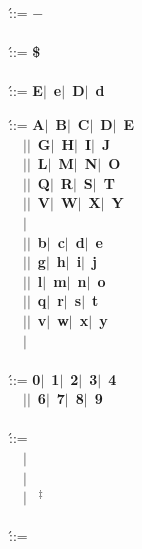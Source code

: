 \begin{bnf_tabbing}
\>  \' ::= \> {\bf\boldmath $-$} \\
\\
\>  \' ::= \> {\bf \$} \\
\\
\digittabbing
\>  \' ::= \> 
   {\bf E}\>$|$~{\bf e}\>$|$~{\bf D}\>$|$~{\bf d} \\
\end{bnf_tabbing}\newpage\begin{bnf_tabbing}
\digittabbing
\>  \' ::= \> 
   {\bf A}\>$|$~{\bf B}\>$|$~{\bf C}\>$|$~{\bf D}\>$|$~{\bf E} \\
\>~~$|$\>$|$~{\bf G}\>$|$~{\bf H}\>$|$~{\bf I}\>$|$~{\bf J} \\
\>~~$|$\>$|$~{\bf L}\>$|$~{\bf M}\>$|$~{\bf N}\>$|$~{\bf O} \\
\>~~$|$\>$|$~{\bf Q}\>$|$~{\bf R}\>$|$~{\bf S}\>$|$~{\bf T} \\
\>~~$|$\>$|$~{\bf V}\>$|$~{\bf W}\>$|$~{\bf X}\>$|$~{\bf Y} \\
\>~~$|$ \\
\>~~$|$\>$|$~{\bf b}\>$|$~{\bf c}\>$|$~{\bf d}\>$|$~{\bf e} \\
\>~~$|$\>$|$~{\bf g}\>$|$~{\bf h}\>$|$~{\bf i}\>$|$~{\bf j} \\
\>~~$|$\>$|$~{\bf l}\>$|$~{\bf m}\>$|$~{\bf n}\>$|$~{\bf o} \\
\>~~$|$\>$|$~{\bf q}\>$|$~{\bf r}\>$|$~{\bf s}\>$|$~{\bf t} \\
\>~~$|$\>$|$~{\bf v}\>$|$~{\bf w}\>$|$~{\bf x}\>$|$~{\bf y} \\
\>~~$|$ \\
\\
\>  \' ::= \>
   {\bf 0}\>$|$~{\bf 1}\>$|$~{\bf 2}\>$|$~{\bf 3}\>$|$~{\bf 4} \\
\>~~$|$\>$|$~{\bf 6}\>$|$~{\bf 7}\>$|$~{\bf 8}\>$|$~{\bf 9} \\
\bnftabbing
\\
\>  \' ::= \>
    \\
\> ~~$|$ \>  \\
\> ~~$|$ \>  \\
\> ~~$|$ \> ~{\sf $^{\ddagger}$} \\
\\
\>  \' ::= \>
    \\

\end{bnf_tabbing}
